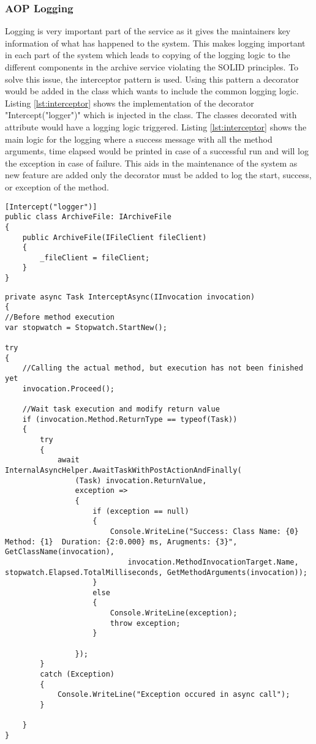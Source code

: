 \subsubsection{AOP Logging}
Logging is very important part of the service as it gives the maintainers key information of what has happened to the system. This makes logging important
in each part of the system which leads to copying of the logging logic to the different components in the archive service violating the SOLID \cite{Hotop2015} principles. 
To solve this issue, the interceptor pattern is used. Using this pattern a decorator would be added in the class which wants to include the common
logging logic. Listing \ref{lst:interceptor} shows the implementation of the decorator "Intercept("logger")" which is injected in the class. The 
classes decorated with attribute would have a logging logic triggered. Listing \ref{lst:interceptor} shows the main logic for the logging where a success message
with all the method arguments, time elapsed would be printed in case of a successful run and will log the exception in case of failure. This aids in the maintenance
of the system as new feature are added only the decorator must be added to log the start, success, or exception of the method.

\begin{lstlisting}[language={[Sharp]C}, caption={Interceptor decorator example}, captionpos=b,label={lst:interceptor}]
[Intercept("logger")]
public class ArchiveFile: IArchiveFile
{
    public ArchiveFile(IFileClient fileClient)
    {
        _fileClient = fileClient;
    }
}
\end{lstlisting}            

\begin{lstlisting}[language={[Sharp]C}, caption={Interceptor logger logic implementation}, captionpos=b,label={lst:interceptor}]
private async Task InterceptAsync(IInvocation invocation)
{
//Before method execution
var stopwatch = Stopwatch.StartNew();

try
{
    //Calling the actual method, but execution has not been finished yet
    invocation.Proceed();

    //Wait task execution and modify return value
    if (invocation.Method.ReturnType == typeof(Task))
    {
        try
        {
            await InternalAsyncHelper.AwaitTaskWithPostActionAndFinally(
                (Task) invocation.ReturnValue,
                exception =>
                {
                    if (exception == null)
                    {
                        Console.WriteLine("Success: Class Name: {0} Method: {1}  Duration: {2:0.000} ms, Arugments: {3}", GetClassName(invocation),
                            invocation.MethodInvocationTarget.Name, stopwatch.Elapsed.TotalMilliseconds, GetMethodArguments(invocation));
                    }
                    else
                    {
                        Console.WriteLine(exception);
                        throw exception;
                    }
                    
                });
        }
        catch (Exception)
        {
            Console.WriteLine("Exception occured in async call");
        }
        
    }
}
\end{lstlisting}            

